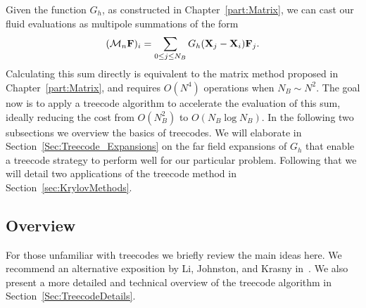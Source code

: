 Given the function $G_h$, as constructed in Chapter~\ref{part:Matrix}, we can cast
our fluid evaluations as multipole summations of the form
\begin{equation}
(\mathcal{M}_n\mathbf{F})_i = \sum_{0\leq j\leq N_B} G_h(\mathbf{X}_j - \mathbf{X}_i) \mathbf{F}_j.
\label{meq:IBMultipole}
\end{equation}
Calculating this sum directly is equivalent to the matrix method proposed in Chapter~\ref{part:Matrix}, and requires $O(N^4)$ operations when $N_B\sim N^2$.
The goal now is to apply a treecode algorithm to accelerate the evaluation of this sum, ideally reducing the cost from $O(N_B^2)$ to $O(N_B\log N_B)$. In the following two subsections we overview the basics of treecodes. We will elaborate in Section~\ref{Sec:Treecode_Expansions} on the far field expansions of $G_h$ that enable a treecode strategy to perform well for our particular problem. Following that we will detail two applications of the treecode method in Section~\ref{sec:KrylovMethods}.



\subsection{Overview}
For those unfamiliar with treecodes we briefly review the main ideas here. We recommend an alternative  exposition by Li, Johnston, and Krasny in~\cite{TreeCode_Krasny}. We also present a more detailed and technical overview of the treecode algorithm in Section~\ref{Sec:TreecodeDetails}.

